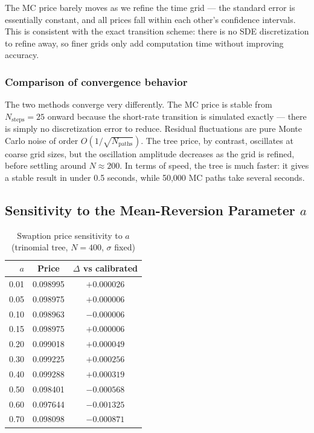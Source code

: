 \documentclass[12pt, a4paper]{article}
\begin{document}
The MC price barely moves as we refine the time grid — the standard error is essentially constant, and all prices fall within each other's confidence intervals. This is consistent with the exact transition scheme: there is no SDE discretization to refine away, so finer grids only add computation time without improving accuracy.

\subsubsection{Comparison of convergence behavior}

The two methods converge very differently. The MC price is stable from $N_{\text{steps}} = 25$ onward because the short-rate transition is simulated exactly — there is simply no discretization error to reduce. Residual fluctuations are pure Monte Carlo noise of order $O(1/\sqrt{N_{\text{paths}}})$. The tree price, by contrast, oscillates at coarse grid sizes, but the oscillation amplitude decreases as the grid is refined, before settling around $N \approx 200$. In terms of speed, the tree is much faster: it gives a stable result in under 0.5 seconds, while 50,000 MC paths take several seconds.

\subsection{Sensitivity to the Mean-Reversion Parameter $a$}

\begin{table}[H]
\centering
\begin{tabular}{rcc}
\toprule
\textbf{$a$} & \textbf{Price} & \textbf{$\Delta$ vs calibrated} \\
\midrule
0.01  & 0.098995 & $+0.000026$ \\
0.05  & 0.098975 & $+0.000006$ \\
0.10  & 0.098963 & $-0.000006$ \\
0.15  & 0.098975 & $+0.000006$ \\
0.20  & 0.099018 & $+0.000049$ \\
0.30  & 0.099225 & $+0.000256$ \\
0.40  & 0.099288 & $+0.000319$ \\
0.50  & 0.098401 & $-0.000568$ \\
0.60  & 0.097644 & $-0.001325$ \\
0.70  & 0.098098 & $-0.000871$ \\
\bottomrule
\end{tabular}
\caption{Swaption price sensitivity to $a$ (trinomial tree, $N=400$, $\sigma$ fixed)}
\end{table}
\end{document}
